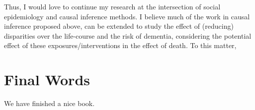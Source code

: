 \documentclass[
]{book}
\begin{document}
Thus, I would love to continue my research at the intersection of social epidemiology and causal inference methods. I believe much of the work in causal inference proposed above, can be extended to study the effect of (reducing) disparities over the life-course and the risk of dementia, considering the potential effect of these exposures/interventions in the effect of death. To this matter,

\hypertarget{chapter5}{%
\chapter{Final Words}\label{chapter5}}

We have finished a nice book.

\printbibliography
\end{document}
